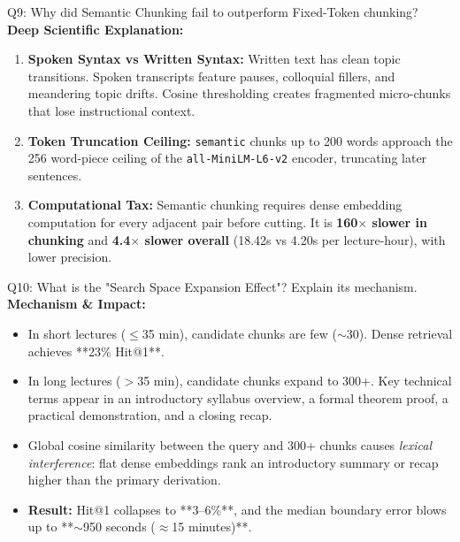 \documentclass[10pt,a4paper]{article}
\begin{document}
\begin{quesbox}{Q9: Why did Semantic Chunking fail to outperform Fixed-Token chunking?}
\textbf{Deep Scientific Explanation:}
\begin{enumerate}[leftmargin=*]
    \item \textbf{Spoken Syntax vs Written Syntax:} Written text has clean topic transitions. Spoken transcripts feature pauses, colloquial fillers, and meandering topic drifts. Cosine thresholding creates fragmented micro-chunks that lose instructional context.
    \item \textbf{Token Truncation Ceiling:} \texttt{semantic} chunks up to 200 words approach the 256 word-piece ceiling of the \texttt{all-MiniLM-L6-v2} encoder, truncating later sentences.
    \item \textbf{Computational Tax:} Semantic chunking requires dense embedding computation for every adjacent pair before cutting. It is \textbf{160$\times$ slower in chunking} and \textbf{4.4$\times$ slower overall} (18.42s vs 4.20s per lecture-hour), with lower precision.
\end{enumerate}
\end{quesbox}

\begin{quesbox}{Q10: What is the "Search Space Expansion Effect"? Explain its mechanism.}
\textbf{Mechanism \& Impact:}
\begin{itemize}[leftmargin=*]
    \item In short lectures ($\le$35 min), candidate chunks are few ($\sim$30). Dense retrieval achieves **23\% Hit@1**.
    \item In long lectures ($>$35 min), candidate chunks expand to 300+. Key technical terms appear in an introductory syllabus overview, a formal theorem proof, a practical demonstration, and a closing recap.
    \item Global cosine similarity between the query and 300+ chunks causes \textit{lexical interference}: flat dense embeddings rank an introductory summary or recap higher than the primary derivation.
    \item \textbf{Result:} Hit@1 collapses to **3--6\%**, and the median boundary error blows up to **$\sim$950 seconds ($\approx$15 minutes)**.
\end{itemize}
\end{quesbox}
\end{document}
